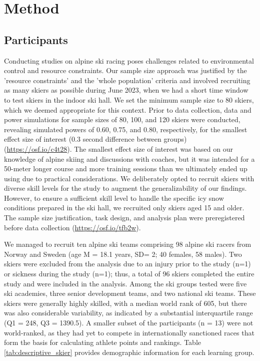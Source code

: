 \documentclass[pdflatex,sn-nature]{sn-jnl}%
\theoremstyle{thmstyleone}%
\theoremstyle{thmstyletwo}%
\theoremstyle{thmstylethree}%
\begin{document}
\section{Method}


\subsection{Participants}
Conducting studies on alpine ski racing poses challenges related to environmental control and resource constraints. Our sample size approach was justified by the 'resource constraints' and the 'whole population' criteria \cite{lakens_sample_2022} and involved recruiting as many skiers as possible during June 2023, when we had a short time window to test skiers in the indoor ski hall. We set the minimum sample size to 80 skiers, which we deemed appropriate for this context. Prior to data collection, data and power simulations for sample sizes of 80, 100, and 120 skiers were conducted, revealing simulated powers of 0.60, 0.75, and 0.80, respectively, for the smallest effect size of interest (0.3 second difference between groups) (\url{https://osf.io/c4t28}). The smallest effect size of interest was based on our knowledge of alpine skiing and discussions with coaches, but it was intended for a 50-meter longer course and more training sessions than we ultimately ended up using due to practical considerations. We deliberately opted to recruit skiers with diverse skill levels for the study to augment the generalizability of our findings. However, to ensure a sufficient skill level to handle the specific icy snow conditions prepared in the ski hall, we recruited only skiers aged 15 and older. The sample size justification, task design, and analysis plan were preregistered before data collection (\url{https://osf.io/tfb2w}).

We managed to recruit ten alpine ski teams comprising 98 alpine ski racers from Norway and Sweden (age M = 18.1 years, SD= 2; 40 females, 58 males). Two skiers were excluded from the analysis due to an injury prior to the study (n=1) or sickness during the study (n=1); thus, a total of 96 skiers completed the entire study and were included in the analysis.  Among the ski groups tested were five ski academies, three senior development teams, and two national ski teams. These skiers were generally highly skilled, with a median world rank of 605, but there was also considerable variability, as indicated by a substantial interquartile range (Q1 = 248, Q3 = 1390.5). A smaller subset of the participants (n = 13) were not world-ranked, as they had yet to compete in internationally sanctioned races that form the basis for calculating athlete points and rankings. Table \ref{tab:descriptive_skier} provides demographic information for each learning group.
\end{document}
